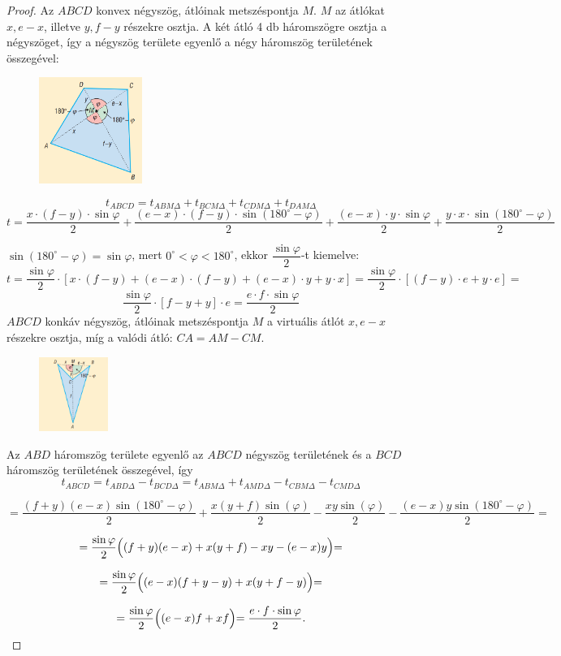 \documentclass[12pt,a4paper]{article}
\begin{document}
\begin{proof}
Az $ABCD$ konvex négyszög, átlóinak metszéspontja $M$. $M$ az átlókat $x, e - x$, illetve $y, f - y$ részekre osztja. A két átló 4 db háromszögre osztja a négyszöget, így a négyszög területe egyenlő a négy háromszög területének összegével:
\begin{figure}[h]
\centering
\includegraphics[width=0.3\textwidth]{negyszog_terulete_biz}
\end{figure}

$$t_{ABCD}=t_{ABM\Delta}+t_{BCM\Delta}+t_{CDM\Delta}+t_{DAM\Delta}$$
$$t=\dfrac{x \cdot (f-y) \cdot \sin \varphi}{2}+\dfrac{(e-x) \cdot (f-y) \cdot \sin (180^\circ-\varphi)}{2}+\dfrac{(e-x) \cdot y \cdot \sin \varphi}{2}+\dfrac{y \cdot x \cdot \sin (180^\circ-\varphi)}{2}$$

$\sin(180^\circ-\varphi)=\sin \varphi$, mert $0^\circ<\varphi<180^\circ$, ekkor $\dfrac{\sin \varphi}{2}$-t kiemelve:
$$t=\dfrac{\sin \varphi}{2}\cdot [x \cdot (f-y) + (e-x) \cdot (f-y) + (e-x) \cdot y + y \cdot x]=\dfrac{\sin \varphi}{2}\cdot [(f-y)\cdot e+y\cdot e]=$$
$$\dfrac{\sin \varphi}{2} \cdot [f-y+y]\cdot e=\dfrac{e\cdot f\cdot \sin \varphi}{2}$$
\newpage
$ABCD$ konkáv négyszög, átlóinak metszéspontja $M$ a virtuális átlót $x, e - x$ részekre osztja, míg a valódi átló: $CA = AM - CM$.
\begin{figure}[h]
\centering
\includegraphics[width=0.2\textwidth]{konkav_negyszog_terulet}
\end{figure}

Az $ABD$ háromszög területe egyenlő az $ABCD$ négyszög területének és a $BCD$ háromszög területének összegével, így
$$t_{ABCD}=t_{ABD\Delta}-t_{BCD\Delta}=t_{ABM\Delta}+t_{AMD\Delta}-t_{CBM\Delta}-t_{CMD\Delta}$$

\[=\dfrac{(f+y)(e-x)\sin(180^\circ-\varphi)}{2}+\dfrac{x(y+f)\sin(\varphi)}{2}-\dfrac{xy\sin(\varphi)}{2}-\dfrac{(e-x)y\sin(180^\circ-\varphi)}{2}=\]

\[=\dfrac{\sin \varphi}{2}\Bigl((f+y)(e-x)+x(y+f)-xy-(e-x)y \Bigl)=\]

\[=\dfrac{\sin \varphi}{2}\Bigl((e-x)(f+y-y)+x(y+f-y) \Bigl)=\]

\[=\dfrac{\sin \varphi}{2}\Bigl((e-x)f+xf \Bigl)=\dfrac{e\cdot f\cdot \sin \varphi}{2}.\]
\end{proof}
\end{document}
